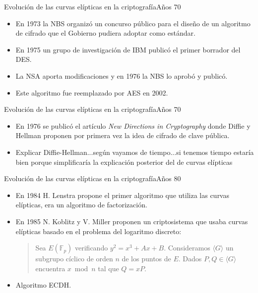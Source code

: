 \documentclass[spanish]{beamer}
\begin{document}
\begin{frame}[fragile]{Evolución de las curvas elípticas en la criptografía}{Años 70}
  \begin{itemize}
    \item En 1973 la NBS organizó un concurso público para el diseño de un algoritmo de cifrado que el Gobierno pudiera adoptar como estándar.
    \item En 1975 un grupo de investigación de IBM publicó el primer borrador del DES.
    \item La NSA aporta modificaciones y en 1976 la NBS lo aprobó y publicó. %
    \item Este algoritmo fue reemplazado por AES en 2002.
  \end{itemize}
\end{frame}

\begin{frame}[fragile]{Evolución de las curvas elípticas en la criptografía}{Años 70}
  \begin{itemize}
  \item En 1976 se publicó el artículo \textit{New Directions in Cryptography} donde Diffie y Hellman proponen por primera vez la idea de cifrado de clave pública. %
  \item Explicar Diffie-Hellman...según vayamos de tiempo...si tenemos tiempo estaría bien porque simplificaría la explicación posterior del de curvas elípticas
  \end{itemize}
\end{frame}

\begin{frame}[fragile]{Evolución de las curvas elípticas en la criptografía}{Años 80}
  \begin{itemize}
    \item En 1984 H. Lenstra propone el primer algoritmo que utiliza las curvas elípticas, era un algoritmo de factorización.
    \item En 1985 N. Koblitz y V. Miller proponen un criptosistema que usaba curvas elípticas basado en el problema del logaritmo discreto:
    \begin{quote}
      Sea $E(\mathbb{F}_p)$ verificando $y^2 =x^3 + Ax + B$. Consideramos $\langle G \rangle$ un subgrupo cíclico de orden $n$ de los puntos de $E$. Dados $P,Q \in \langle G \rangle$ encuentra $x \bmod{n}$ tal que $Q=xP$.
      \end{quote}
    \item Algoritmo ECDH. 
  \end{itemize}
\end{frame}
\end{document}
